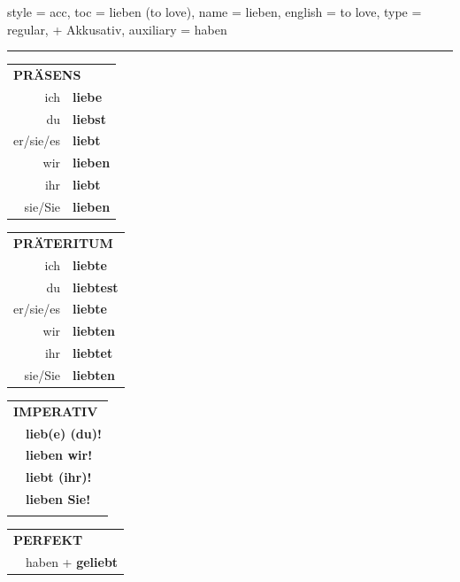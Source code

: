 \begin{verbentry}{
  style = {acc},
  toc = {lieben (to love)},
  name = {lieben},
  english = {to love},
  type = {regular, + Akkusativ},
  auxiliary = {haben}
}
 
    
     \vspace{5pt}

    \hrule
    
    \vspace{5pt}

  \begin{tabular}{rl}
     \multicolumn{2}{l}{\textbf{PRÄSENS} }\\
    ich & \textbf{liebe}\\
    du & \textbf{liebst}\\
    er/sie/es & \textbf{liebt}\\
    wir & \textbf{lieben}\\
    ihr & \textbf{liebt}\\
    sie/Sie & \textbf{lieben}\\
  \end{tabular}
  \hfill
     \begin{tabular}{rl}
    \multicolumn{2}{l}{\textbf{PRÄTERITUM} }\\
    ich & \textbf{liebte}\\
    du & \textbf{liebtest}\\
    er/sie/es & \textbf{liebte}\\
    wir & \textbf{liebten}\\
    ihr & \textbf{liebtet}\\
    sie/Sie & \textbf{liebten}\\
  \end{tabular}
  \hfill
  \begin{tabular}{rl}
     \multicolumn{2}{l}{\textbf{IMPERATIV} }\\
   & \textbf{lieb(e) (du)!}\\
   & \textbf{lieben wir!}\\
   & \textbf{liebt (ihr)!}\\
   & \textbf{lieben Sie!}\\
   & \vspace{10pt}
  \end{tabular}

    \vspace{10pt}

 \begin{tabular}{rl}
     \multicolumn{2}{l}{\textbf{PERFEKT}}\\
   & haben + \textbf{geliebt}\\
  \end{tabular}
\hfill
   \begin{tabular}{rl}
   

\end{tabular}
\end{verbentry}

